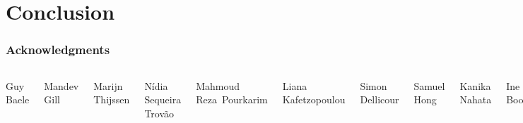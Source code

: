 \documentclass{beamer}
\begin{document}
\section{Conclusion}

\begin{frame}
  \frametitle{Acknowledgments}
  \begin{columns}[c] %


    Guy Baele

    Mandev Gill

    \vspace{5mm}

    Marijn Thijssen

    N\'{i}dia Sequeira Trov\~{a}o

    Mahmoud Reza~Pourkarim

    \vspace{5mm}

    Liana Kafetzopoulou

    Simon Dellicour


    Samuel Hong

    Kanika Nahata

    Ine Boonen

    Yiqiao Li

    Jade Membrebe

    Nena Bollen

    Magda Bletsa

    \vspace{5mm}

    Gytis Dudas


    KU Leuven

    Rega Institute

    \vspace{5mm}

    Belgian American Education Foundation

    \vspace{5mm}

    \includegraphics[width=.75\linewidth]{image/baef_logo}

  \end{columns}
\end{frame}
\end{document}
